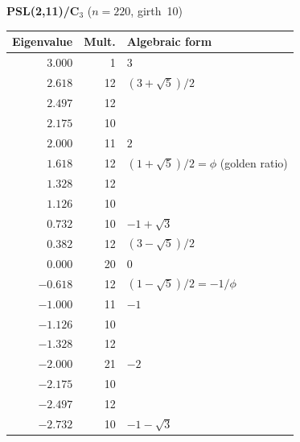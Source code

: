 \documentclass[11pt,a4paper]{amsart}
\theoremstyle{definition}
\theoremstyle{remark}
\begin{document}
\begin{table}[ht]
\begin{center}
\bigskip\noindent\textbf{PSL(2,11)/C$_3$} \quad ($n=220$, girth~10)
\smallskip

\begin{tabular}{rrl}
\toprule
Eigenvalue & Mult. & Algebraic form \\
\midrule
$3.000$ & 1 & $3$ \\
$2.618$ & 12 & $(3+\sqrt{5})/2$ \\
$2.497$ & 12 & \\
$2.175$ & 10 & \\
$2.000$ & 11 & $2$ \\
$1.618$ & 12 & $(1+\sqrt{5})/2 = \phi$ (golden ratio) \\
$1.328$ & 12 & \\
$1.126$ & 10 & \\
$0.732$ & 10 & $-1+\sqrt{3}$ \\
$0.382$ & 12 & $(3-\sqrt{5})/2$ \\
$0.000$ & 20 & $0$ \\
$-0.618$ & 12 & $(1-\sqrt{5})/2 = -1/\phi$ \\
$-1.000$ & 11 & $-1$ \\
$-1.126$ & 10 & \\
$-1.328$ & 12 & \\
$-2.000$ & 21 & $-2$ \\
$-2.175$ & 10 & \\
$-2.497$ & 12 & \\
$-2.732$ & 10 & $-1-\sqrt{3}$ \\
\bottomrule
\end{tabular}

\end{center}
\end{table}
\end{document}
